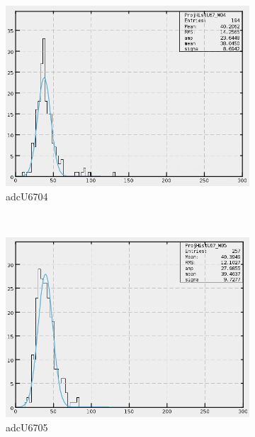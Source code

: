 \begin{figure}[h]
\begin{subfigure}[h]{0.3\textwidth}
        \includegraphics[width=\textwidth, keepaspectratio = true]{adcU67_04}
        \caption{adcU6704}
        \label{fig:adcU67_04}
    \end{subfigure}
    \\
    \begin{subfigure}[h]{0.3\textwidth}
        \centering
        \includegraphics[width=\textwidth, keepaspectratio = true]{adcU67_05}
        \caption{adcU6705}
        \label{fig:adcU67_05}
    \end{subfigure}
    ~
    \begin{subfigure}[h]{0.3\textwidth}
        \centering

\end{subfigure}
\end{figure}
